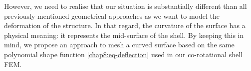 However, we need to realise that our situation is substantially different than all previously mentioned geometrical approaches as we want to model the deformation of the structure. In that regard, the curvature of the surface has a physical meaning: it represents the mid-surface of the shell. By keeping this in mind, we propose an approach to mesh a curved surface based on the same polynomial shape function \eqref{chap8:eq-deflection} used in our co-rotational shell FEM. 

%
%
%
%
